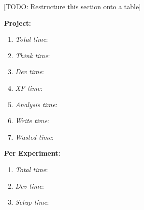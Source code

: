 \documentclass[a4paper, sigconf, twocolumn]{acmart}
\begin{document}
[TODO: Restructure this section onto a table]

\textbf{Project:}
\begin{enumerate}
  \item{\emph{Total time}: }
  \item{\emph{Think time}: }
  \item{\emph{Dev time}: }
  \item{\emph{XP time}: }
  \item{\emph{Analysis time}: }
  \item{\emph{Write time}: }
  \item{\emph{Wasted time}: }
\end{enumerate}

\textbf{Per Experiment:}
\begin{enumerate}
  \item{\emph{Total time}: }
  \item{\emph{Dev time}: }
  \item{\emph{Setup time}: }
\end{enumerate}
\end{document}
